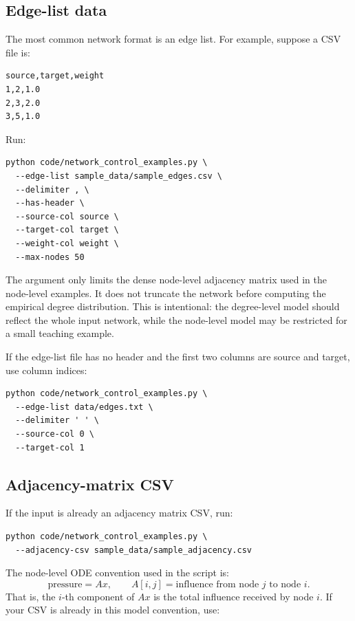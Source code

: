 \documentclass[11pt,a4paper]{article}
\DeclareRobustCommand{\code}[1]{\texttt{\detokenize{#1}}}
\begin{document}
\subsection{Edge-list data}

The most common network format is an edge list. For example, suppose a CSV file is:

\begin{lstlisting}[style=text]
source,target,weight
1,2,1.0
2,3,2.0
3,5,1.0
\end{lstlisting}

Run:

\begin{lstlisting}[style=bash]
python code/network_control_examples.py \
  --edge-list sample_data/sample_edges.csv \
  --delimiter , \
  --has-header \
  --source-col source \
  --target-col target \
  --weight-col weight \
  --max-nodes 50
\end{lstlisting}

The argument \code{--max-nodes 50} only limits the dense node-level adjacency matrix used in the node-level examples. It does not truncate the network before computing the empirical degree distribution. This is intentional: the degree-level model should reflect the whole input network, while the node-level model may be restricted for a small teaching example.

If the edge-list file has no header and the first two columns are source and target, use column indices:

\begin{lstlisting}[style=bash]
python code/network_control_examples.py \
  --edge-list data/edges.txt \
  --delimiter ' ' \
  --source-col 0 \
  --target-col 1
\end{lstlisting}

\subsection{Adjacency-matrix CSV}

If the input is already an adjacency matrix CSV, run:

\begin{lstlisting}[style=bash]
python code/network_control_examples.py \
  --adjacency-csv sample_data/sample_adjacency.csv
\end{lstlisting}

The node-level ODE convention used in the script is:
\[
  \text{pressure}=A x,
  \qquad
  A[i,j]=\text{influence from node }j\text{ to node }i.
\]
That is, the \(i\)-th component of \(Ax\) is the total influence received by node \(i\). If your CSV is already in this model convention, use:
\end{document}
